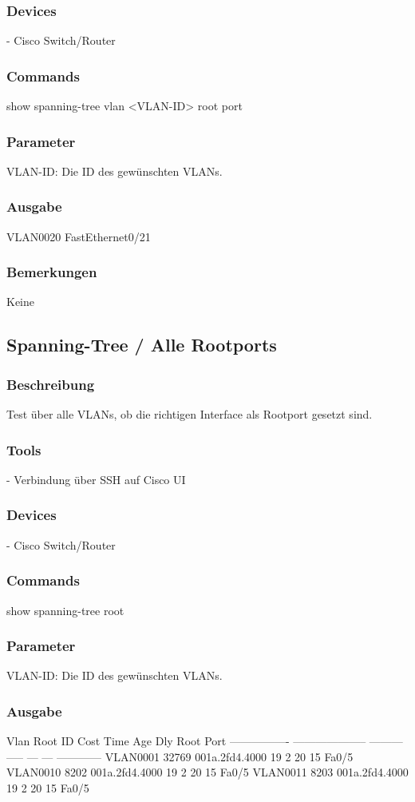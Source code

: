 \documentclass[a4,12pt]{scrartcl}
\begin{document}
\subsubsection{Devices}
- Cisco Switch/Router
\subsubsection{Commands}
show spanning-tree vlan <VLAN-ID> root port
\subsubsection{Parameter}
VLAN-ID: Die ID des gewünschten VLANs.
\subsubsection{Ausgabe}
VLAN0020         FastEthernet0/21
\subsubsection{Bemerkungen}
Keine


\subsection{Spanning-Tree / Alle Rootports}
\subsubsection{Beschreibung}
Test über alle VLANs, ob die richtigen Interface als Rootport gesetzt sind.
\subsubsection{Tools}
- Verbindung über SSH auf Cisco UI
\subsubsection{Devices}
- Cisco Switch/Router
\subsubsection{Commands}
show spanning-tree root
\subsubsection{Parameter}
VLAN-ID: Die ID des gewünschten VLANs.
\subsubsection{Ausgabe}
Vlan                   Root ID          Cost    Time  Age Dly  Root Port\newline
---------------- -------------------- --------- ----- --- ---  ------------\newline
VLAN0001         32769 001a.2fd4.4000        19    2   20  15  Fa0/5\newline
VLAN0010          8202 001a.2fd4.4000        19    2   20  15  Fa0/5\newline
VLAN0011          8203 001a.2fd4.4000        19    2   20  15  Fa0/5\newline
\end{document}
